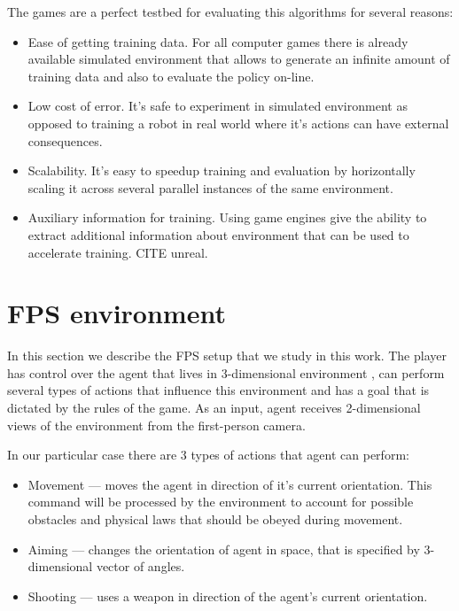 
The games are a perfect testbed for evaluating this algorithms for several reasons:
\begin{itemize}
    \item Ease of getting training data. For all computer games there is already available simulated environment that allows to generate
        an infinite amount of training data and also to evaluate the policy on-line.
    \item Low cost of error. It's safe to experiment in simulated environment as opposed to training a robot in real world where it's actions can have external consequences. 
    \item Scalability. It's easy to speedup training and evaluation by horizontally scaling it across several parallel instances of the same environment.
    \item Auxiliary information for training. Using game engines give the ability to extract additional information about environment that can be used to accelerate training. CITE unreal.
\end{itemize}

\section{FPS environment}
In this section we describe the FPS setup that we study in this work.
The player has control over the agent that lives in 3-dimensional environment , can perform several types of actions that influence this environment and has a goal that is dictated by the rules of the game.
As an input, agent receives 2-dimensional views of the environment from the first-person camera.

In our particular case there are 3 types of actions that agent can perform:
\begin{itemize}
    \item Movement --- moves the agent in direction of it's current orientation. This command will be processed by the environment to account for possible obstacles and physical laws that should be obeyed during movement.
    \item Aiming --- changes the orientation of agent in space, that is specified by 3-dimensional vector of angles.
    \item Shooting --- uses a weapon in direction of the agent's current orientation.
\end{itemize}

